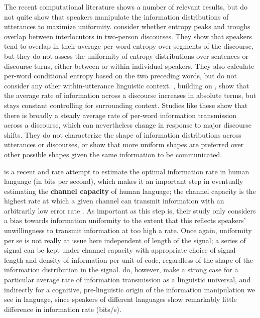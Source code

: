 \documentclass[12pt]{article}
\begin{document}
The recent computational literature shows a number of relevant results, but do not quite show that speakers manipulate the information distributions of utterances to maximize uniformity. \citet{xureitter2016, xureitter2018} consider whether entropy peaks and troughs overlap between interlocutors in two-person discourses. They show that speakers tend to overlap in their average per-word entropy over segments of the discourse, but they do not assess the uniformity of entropy distributions over sentences or discourse turns, either between or within individual speakers. They also calculate per-word conditional entropy based on the two preceding words, but do not consider any other within-utterance linguistic context. \citet{doylefrank2015}, building on \citet{genzelcharniak2002}, show that the average rate of information across a discourse increases in absolute terms, but stays constant controlling for surrounding context. Studies like these show that there is broadly a steady average rate of per-word information transmission across a discourse, which can nevertheless change in response to major discourse shifts. They do not characterize the shape of information distributions across utterances or discourses, or show that more uniform shapes are preferred over other possible shapes given the same information to be communicated.

\citet{coupeetal2019} is a recent and rare attempt to estimate the optimal information rate in human language (in bits per second), which makes it an important step in eventually estimating the \textbf{channel capacity} of human language; the channel capacity is the highest rate at which a given channel can transmit information with an arbitrarily low error rate \citet{shannon1948}. As important as this step is, their study only considers a bias towards information uniformity to the extent that this reflects speakers' unwillingness to transmit information at too high a rate. Once again, uniformity per se is not really at issue here independent of length of the signal; a series of signal can be kept under channel capacity with appropriate choice of signal length and density of information per unit of code, regardless of the shape of the information distribution in the signal. \citet{coupeetal2019} do, however, make a strong case for a particular average rate of information transmission as a linguistic universal, and indirectly for a cognitive, pre-linguistic origin of the information manipulation we see in language, since speakers of different languages show remarkably little difference in information rate (bits/s).
\end{document}
